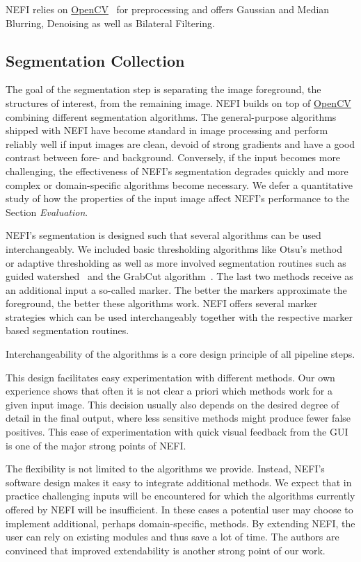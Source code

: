 		NEFI relies on \href{http://opencv.org/}{OpenCV}~\cite{opencv} for preprocessing and offers Gaussian and Median Blurring, Denoising as well as Bilateral Filtering.

	\subsection{Segmentation Collection}

		The goal of the segmentation step is separating the image foreground, \ie the structures of interest, from the remaining image. NEFI builds on top of \href{http://opencv.org/}{OpenCV}~\cite{opencv} combining different segmentation algorithms. The general-purpose algorithms shipped with NEFI have become standard in image processing and perform reliably well if input images are clean, devoid of strong gradients and have a good contrast between fore- and background. Conversely, if the input becomes more challenging, the effectiveness of NEFI's segmentation degrades quickly and more complex or domain-specific algorithms become necessary. We defer a quantitative study of how the properties of the input image affect NEFI's performance to the Section \emph{Evaluation}. 

		NEFI's segmentation is designed such that several algorithms can be used interchangeably. We included basic thresholding algorithms like Otsu's method~\cite{otsu1979} or adaptive thresholding as well as more involved segmentation routines such as guided watershed~\cite{watershed91} and the GrabCut algorithm~\cite{grabcut2004}. The last two methods receive as an additional input a so-called marker. The better the markers approximate the foreground, the better these algorithms work. NEFI offers several marker strategies which can be used interchangeably together with the respective marker based segmentation routines. 

		Interchangeability of the algorithms is a core design principle of all pipeline steps.

		This design facilitates easy experimentation with different methods. Our own experience shows that often it is not clear a priori which methods work for a given input image. This decision usually also depends on the desired degree of detail in the final output, where less sensitive methods might produce fewer false positives. This ease of experimentation with quick visual feedback from the GUI is one of the major strong points of NEFI.

		The flexibility is not limited to the algorithms we provide. Instead, NEFI's software design makes it easy to integrate additional methods. We expect that in practice challenging inputs will be encountered for which the algorithms currently offered by NEFI will be insufficient. In these cases a potential user may choose to implement additional, perhaps domain-specific, methods. By extending NEFI, the user can rely on existing modules and thus save a lot of time. The authors are convinced that improved extendability is another strong point of our work.


